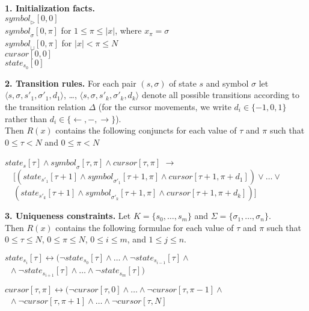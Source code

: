 \documentclass [11pt]{article}
\newcommand{\ra}{\rightarrow}
\newcommand{\tuple}[1]{\langle#1\rangle}
\newcommand{\blank}{\sqcup}
\newcommand{\ssym}{\triangleright}
\newcommand{\lmove}{\leftarrow}
\newcommand{\rmove}{\rightarrow}
\newcommand{\stay}{-}
\newcommand{\sym}[3]{\textit{symbol}_{#1}[#2,#3]}
\newcommand{\cursor}[2]{\textit{cursor}[#1,#2]}
\newcommand{\state}[2]{\textit{state}_{#1}[#2]}
\begin{document}
\smallskip
\noindent
{\bf 1. Initialization facts.} \\
$\sym{\ssym}{0}{0}$  \\
$\sym{\sigma}{0}{\pi}$
  \quad\quad for $1\leq \pi \leq |x|$, where $x_\pi=\sigma$ \\
$\sym{\blank}{0}{\pi}$
  \quad\quad for $|x| < \pi\leq N$ \\
$\cursor{0}{0}$\\
$\state{s_0}{0}$

\smallskip
\noindent
{\bf 2. Transition rules.} For each pair $(s,\sigma)$ of state $s$ and symbol $\sigma$ let $\tuple{s,\sigma,s'_1,\sigma'_1,d_1}$, \dots, 
$\tuple{s,\sigma,s'_k,\sigma'_k,d_k}$ denote all possible transitions according
to the  transition relation $\Delta$ (for the cursor movements, we write $d_i \in \{-1,0,1\}$ rather than $d_i \in \{\lmove,\stay,\rmove\}$).
 \\
Then $R(x)$ contains the 
following conjuncts for each value of $\tau$ and $\pi$ such that $0\leq \tau<N$ and $0
\leq \pi < N$

\smallskip
\noindent
%
$\state{s}{\tau} \wedge \sym{\sigma}{\tau}{\pi} \wedge \cursor{\tau}{\pi}$
$\ra$ \\ 
\mbox{}\ \  $[({\state{s'_1}{\tau+1}}\wedge 
\sym{\sigma'_1}{\tau+1}{\pi} \wedge {\cursor{\tau+1}{\pi+d_1}} 
) \vee \dots \vee $ \\
\mbox{}\ \  $({\state{s'_k}{\tau+1}} \wedge 
\sym{\sigma'_k}{\tau+1}{\pi} \wedge {\cursor{\tau+1}{\pi+d_k}} 
) ] $ 


\smallskip
\noindent
{\bf 3. Uniqueness constraints.} Let 
$K = \{s_0, \dots, s_m\}$ and
$\Sigma = \{\sigma_1, \dots, \sigma_n\}$. \\
Then $R(x)$ contains the following formulae for each value of $\tau$ and $\pi$ such that $0\leq \tau \leq N$, $0 \leq \pi \leq  N$, 
$0 \leq i \leq m$, and $1 \leq j \leq n$.

\smallskip
\noindent
$\state{s_i}{\tau} \leftrightarrow
(\neg \state{s_0}{\tau} \wedge \dots \wedge 
\neg \state{s_{i-1}}{\tau} \wedge \mbox{}$ \\
\mbox{} \quad \ $\mbox{}\wedge \neg \state{s_{i+1}}{\tau} \wedge \dots \wedge 
\neg \state{s_{m}}{\tau})$

\noindent
$\cursor{\tau}{\pi} \leftrightarrow
(\neg \cursor{\tau}{0} \wedge \dots \wedge \neg \cursor{\tau}{\pi - 1} 
\wedge \mbox{}$ \\
\mbox{} \quad \ $\mbox{}\wedge 
\neg \cursor{\tau}{\pi+1} \wedge \dots \wedge \neg \cursor{\tau}{N}$ 
\end{document}
